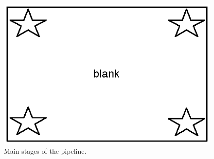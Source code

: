 \begin{figure}
\begin{centering}
\includegraphics{figs/blank.eps}
\caption{Main stages of the \ix pipeline.}
\label{fig:pipeline}
\end{centering}
\end{figure}

